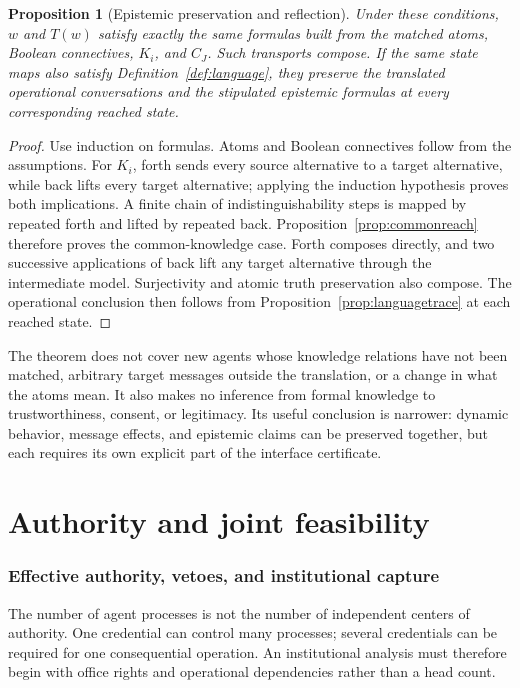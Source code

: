 \documentclass[11pt,letterpaper]{article}
\theoremstyle{plain}
\newtheorem{proposition}{Proposition}[section]
\theoremstyle{definition}
\theoremstyle{remark}
\begin{document}
\begin{proposition}[Epistemic preservation and reflection]\label{prop:epistemictransport}
Under these conditions, $w$ and $T(w)$ satisfy exactly the same formulas built from the matched atoms, Boolean connectives, $K_i$, and $C_J$. Such transports compose. If the same state maps also satisfy Definition~\ref{def:language}, they preserve the translated operational conversations and the stipulated epistemic formulas at every corresponding reached state.
\end{proposition}
\begin{proof}
Use induction on formulas. Atoms and Boolean connectives follow from the assumptions. For $K_i$, forth sends every source alternative to a target alternative, while back lifts every target alternative; applying the induction hypothesis proves both implications. A finite chain of indistinguishability steps is mapped by repeated forth and lifted by repeated back. Proposition~\ref{prop:commonreach} therefore proves the common-knowledge case. Forth composes directly, and two successive applications of back lift any target alternative through the intermediate model. Surjectivity and atomic truth preservation also compose. The operational conclusion then follows from Proposition~\ref{prop:languagetrace} at each reached state.
\end{proof}

The theorem does not cover new agents whose knowledge relations have not been matched, arbitrary target messages outside the translation, or a change in what the atoms mean. It also makes no inference from formal knowledge to trustworthiness, consent, or legitimacy. Its useful conclusion is narrower: dynamic behavior, message effects, and epistemic claims can be preserved together, but each requires its own explicit part of the interface certificate.

\clearpage\part{Authority and joint feasibility}
\section{Effective authority, vetoes, and institutional capture}\label{sec:power}
The number of agent processes is not the number of independent centers of authority. One credential can control many processes; several credentials can be required for one consequential operation. An institutional analysis must therefore begin with office rights and operational dependencies rather than a head count.
\end{document}
